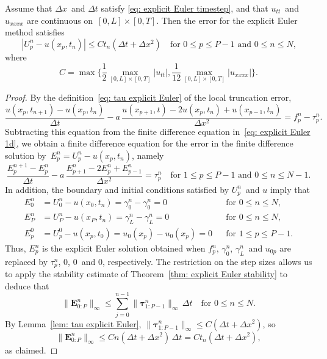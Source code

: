 \begin{theorem}\label{thm: explicit Euler error}
Assume that $\Delta x$~and $\Delta t$ satisfy 
\eqref{eq: explicit Euler timestep}, and that $u_{tt}$~and $u_{xxxx}$ are 
continuous on~$[0,L]\times[0,T]$. Then the error for the explicit Euler method 
satisfies
\[
|U^n_p-u(x_p,t_n)|\le Ct_n(\Delta t+\Delta x^2)
\quad\text{for $0\le p\le P-1$ and $0\le n\le N$,}
\]
where
\begin{equation}\label{eq: error const explicit Euler}
C=\max\biggl\{\frac{1}{2}\max_{[0,L]\times[0,T]}|u_{tt}|,
	\frac{1}{12}\max_{[0,L]\times[0,T]}|u_{xxxx}|\biggr\}.
\end{equation}
\end{theorem}
\begin{proof}
By the definition~\eqref{eq: tau explicit Euler} of the local truncation error,
\[
\frac{u(x_p,t_{n+1})-u(x_p,t_n)}{\Delta t}
	-a\,\frac{u(x_{p+1},t)-2u(x_p,t_n)+u(x_{p-1},t_n)}{\Delta x^2}
	=f^n_p-\tau^n_p.
\]
Subtracting this equation from the finite difference equation 
in~\eqref{eq: explicit Euler 1d}, we obtain a finite difference equation for
the error in the finite difference solution by~$E^n_p=U^n_p-u(x_p,t_n)$, namely
\[
\frac{E^{n+1}_p-E^n_p}{\Delta t}
	-a\,\frac{E^n_{p+1}-2E^n_p+E^n_{p-1}}{\Delta x^2}=\tau^n_p
\quad\text{for $1\le p\le P-1$ and $0\le n\le N-1$.}
\]
In addition, the boundary and initial conditions satisfied by $U^n_p$~and $u$ 
imply that
\[
\begin{aligned}
E^n_0&=U^n_0-u(x_0,t_n)=\gamma_0^n-\gamma_0^n=0&&\text{for $0\le n\le N$,}\\
E^n_P&=U^n_P-u(x_P,t_n)=\gamma_L^n-\gamma_L^n=0&&\text{for $0\le n\le N$,}\\
E^0_p&=U^0_p-u(x_p,t_0)=u_0(x_p)-u_0(x_p)=0&&\text{for $1\le p\le P-1$.}
\end{aligned}
\]
Thus, $E^n_p$ is the explicit Euler solution obtained when $f^n_p$, 
$\gamma_0^n$, $\gamma_L^n$~and $u_{0p}$ are replaced by $\tau^n_p$, $0$, 
$0$~and $0$, respectively.  The restriction on the step sizes allows us to apply 
the stability estimate of Theorem~\ref{thm: explicit Euler stability} to deduce 
that
\[
\|\boldsymbol{E}^n_{0:P}\|_\infty
	\le\sum_{j=0}^{n-1}\|\boldsymbol{\tau}^n_{1:P-1}\|_\infty\,\Delta t
	\quad\text{for $0\le n\le N$.}
\]
By Lemma~\ref{lem: tau explicit Euler}, 
$\|\boldsymbol{\tau}^n_{1:P-1}\|_\infty\le C(\Delta t+\Delta x^2)$, so
\[
\|\boldsymbol{E}^n_{0:P}\|_\infty\le Cn(\Delta t+\Delta x^2)\,\Delta t
	=Ct_n(\Delta t+\Delta x^2),
\]
as claimed.
\end{proof}

